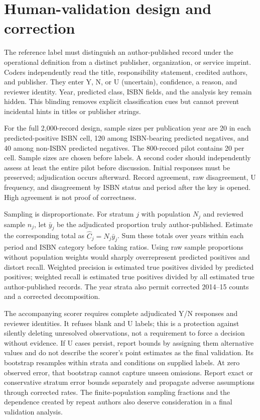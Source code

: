 \documentclass[11pt]{article}
\begin{document}
\clearpage\appendix
\section{Human-validation design and correction}\label{app:validation}

The reference label must distinguish an author-published record under the operational definition from a distinct publisher, organization, or service imprint. Coders independently read the title, responsibility statement, credited authors, and publisher. They enter Y, N, or U (uncertain), confidence, a reason, and reviewer identity. Year, predicted class, ISBN fields, and the analysis key remain hidden. This blinding removes explicit classification cues but cannot prevent incidental hints in titles or publisher strings.

For the full 2,000-record design, sample sizes per publication year are 20 in each predicted-positive ISBN cell, 120 among ISBN-bearing predicted negatives, and 40 among non-ISBN predicted negatives. The 800-record pilot contains 20 per cell. Sample sizes are chosen before labels. A second coder should independently assess at least the entire pilot before discussion. Initial responses must be preserved; adjudication occurs afterward. Record agreement, raw disagreement, U frequency, and disagreement by ISBN status and period after the key is opened. High agreement is not proof of correctness.

Sampling is disproportionate. For stratum $j$ with population $N_j$ and reviewed sample $n_j$, let $\bar y_j$ be the adjudicated proportion truly author-published. Estimate the corresponding total as $\widehat C_j=N_j\bar y_j$. Sum these totals over years within each period and ISBN category before taking ratios. Using raw sample proportions without population weights would sharply overrepresent predicted positives and distort recall. Weighted precision is estimated true positives divided by predicted positives; weighted recall is estimated true positives divided by all estimated true author-published records. The year strata also permit corrected 2014--15 counts and a corrected decomposition.

The accompanying scorer requires complete adjudicated Y/N responses and reviewer identities. It refuses blank and U labels; this is a protection against silently deleting unresolved observations, not a requirement to force a decision without evidence. If U cases persist, report bounds by assigning them alternative values and do not describe the scorer's point estimates as the final validation. Its bootstrap resamples within strata and conditions on supplied labels. At zero observed error, that bootstrap cannot capture unseen omissions. Report exact or conservative stratum error bounds separately and propagate adverse assumptions through corrected rates. The finite-population sampling fractions and the dependence created by repeat authors also deserve consideration in a final validation analysis.
\end{document}
